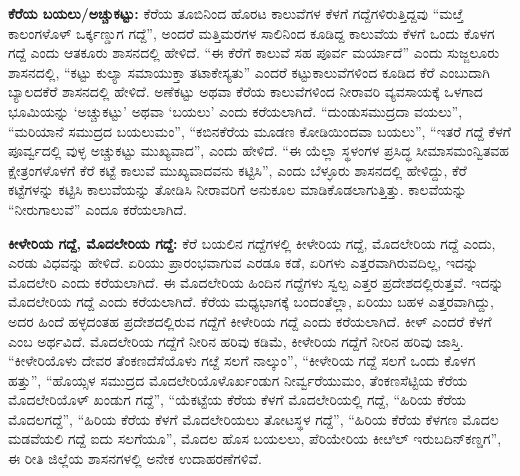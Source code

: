 \textbf{ಕೆರೆಯ ಬಯಲು/ಅಚ್ಚುಕಟ್ಟು:} ಕೆರೆಯ ತೂಬಿನಿಂದ ಹೊರಟ ಕಾಲುವೆಗಳ ಕೆಳಗೆ ಗದ್ದೆಗಳಿರುತ್ತಿದ್ದವು “ಮೞ್ತೆ ಕಾಲಂಗಳೊಳ್​ ಒರ್ಕ್ಕಣ್ಡುಗ ಗದ್ದೆ”, ಅಂದರೆ ಮತ್ತಿಮರಗಳ ಸಾಲಿನಿಂದ ಕೂಡಿದ್ದ ಕಾಲುವೆಯ ಕೆಳಗೆ ಒಂದು ಕೊಳಗ ಗದ್ದೆ ಎಂದು ಆತಕೂರು ಶಾಸನದಲ್ಲಿ ಹೇಳಿದೆ. “ಈ ಕೆರೆಗೆ ಕಾಲುವೆ ಸಹ ಪೂರ್ವ ಮರ್ಯಾದೆ” ಎಂದು ಸುಜ್ಜಲೂರು ಶಾಸನದಲ್ಲಿ, “ಕಟ್ಟು ಕುಲ್ಯಾ ಸಮಾಯುಕ್ತಾ ತಟಾಕೇಸ್ಯತು” ಎಂದರೆ ಕಟ್ಟುಕಾಲುವೆಗಳಿಂದ ಕೂಡಿದ ಕೆರೆ ಎಂಬುದಾಗಿ ಬ್ಯಾಲದಕೆರೆ ಶಾಸನದಲ್ಲಿ ಹೇಳಿದೆ. ಅಣೆಕಟ್ಟು ಅಥವಾ ಕೆರೆಯ ಕಾಲುವೆಗಳಿಂದ ನೀರಾವರಿ ವ್ಯವಸಾಯಕ್ಕೆ ಒಳಗಾದ ಭೂಮಿಯನ್ನು ‘ಅಚ್ಚುಕಟ್ಟು’ ಅಥವಾ ‘ಬಯಲು’ ಎಂದು ಕರೆಯಲಾಗಿದೆ. “ದುಂಡುಸಮುದ್ರದಾ ವಯಲು”, “ಮರಿಯಾನೆ ಸಮುದ್ರದ ಬಯಲುಮಂ”, “ಕಬಿನಕೆರೆಯ ಮೂಡಣ ಕೋಡಿಯಿಂದವಾ ಬಯಲು”, “ಇತರೆ ಗದ್ದೆ ಕೆಳಗೆ ಪೂರ್ವ್ವದಲ್ಲಿ ವುಳ್ಳ ಅಚ್ಚುಕಟ್ಟು ಮುಖ್ಯವಾದ”, ಎಂದು ಹೇಳಿದೆ. “ಈ ಯೆಲ್ಲಾ ಸ್ಥಳಂಗಳ ಪ್ರಸಿದ್ಧ ಸೀಮಾಸಮಂನ್ವಿತವಹ ಕ್ಷೇತ್ರಂಗಳೊಳಗೆ ಕೆರೆ ಕಟ್ಟೆ ಕಾಲುವೆ ಮುಖ್ಯವಾದವನು ಕಟ್ಟಿಸಿ”, ಎಂದು ಬೆಳ್ಳೂರು ಶಾಸನದಲ್ಲಿ ಹೇಳಿದ್ದು, ಕೆರೆ ಕಟ್ಟೆಗಳನ್ನು ಕಟ್ಟಿಸಿ ಕಾಲುವೆಯನ್ನು ತೋಡಿಸಿ ನೀರಾವರಿಗೆ ಅನುಕೂಲ ಮಾಡಿಕೊಡಲಾಗುತ್ತಿತ್ತು. ಕಾಲವೆಯನ್ನು “ನೀರುಗಾಲುವೆ” ಎಂದೂ ಕರೆಯಲಾಗಿದೆ.

\vskip 2pt

\textbf{ಕೀಳೇರಿಯ ಗದ್ದೆ, ಮೊದಲೇರಿಯ ಗದ್ದೆ:} ಕೆರೆ ಬಯಲಿನ ಗದ್ದೆಗಳಲ್ಲಿ ಕೀಳೇರಿಯ ಗದ್ದೆ, ಮೊದಲೇರಿಯ ಗದ್ದೆ ಎಂದು, ಎರಡು ವಿಧವನ್ನು ಹೇಳಿದೆ. ಏರಿಯು ಪ್ರಾರಂಭವಾಗುವ ಎರಡೂ ಕಡೆ, ಏರಿಗಳು ಎತ್ತರವಾಗಿರುವದಿಲ್ಲ, ಇದನ್ನು ಮೊದಲೇರಿ ಎಂದು ಕರೆಯಲಾಗಿದೆ. ಈ ಮೊದಲೇರಿಯ ಹಿಂದಿನ ಗದ್ದೆಗಳು ಸ್ವಲ್ಪ ಎತ್ತರ ಪ್ರದೇಶದಲ್ಲಿರುತ್ತವೆ. ಇದನ್ನು ಮೊದಲೇರಿಯ ಗದ್ದೆ ಎಂದು ಕರೆಯಲಾಗಿದೆ. ಕೆರೆಯ ಮಧ್ಯಭಾಗಕ್ಕೆ ಬಂದಂತೆಲ್ಲಾ, ಏರಿಯು ಬಹಳ ಎತ್ತರವಾಗಿದ್ದು, ಅದರ ಹಿಂದೆ ಹಳ್ಳದಂತಹ ಪ್ರದೇಶದಲ್ಲಿರುವ ಗದ್ದೆಗೆ ಕೀಳೇರಿಯ ಗದ್ದೆ ಎಂದು ಕರೆಯಲಾಗಿದೆ. ಕೀಳ್​ ಎಂದರೆ ಕೆಳಗೆ ಎಂಬ ಅರ್ಥವಿದೆ. ಮೊದಲೇರಿಯ ಗದ್ದೆಗೆ ನೀರಿನ ಹರಿವು ಕಡಿಮೆ, ಕೀಳೇರಿಯ ಗದ್ದೆಗೆ ನೀರಿನ ಹರಿವು ಜಾಸ್ತಿ. “ಕೀಳೇರಿಯೊಳು ದೇವರ ತೆಂಕಣದೆಸೆಯೊಳು ಗೞ್ದೆ ಸಲಗೆ ನಾಲ್ಕುಂ”, “ಕೀಳೇರಿಯ ಗದ್ದೆ ಸಲಗೆ ಒಂದು ಕೊಳಗ ಹತ್ತು”, “ಹೊಯ್ಸಳ ಸಮುದ್ರದ ಮೊದಲೇರಿಯೊಳೊರ್ಖಂಡುಗ ನೀರ್ವ್ವರೆಯುಮಂ, ತೆಂಕಣಸೆಟ್ಟಿಯ ಕೆರೆಯ ಮೊದಲೇರಿಯೊಳ್​ ಖಂಡುಗ ಗದ್ದೆ”, “ಯೆಕಟ್ಟೆಯ ಕೆರೆಯ ಕೆಳಗೆ ಮೊದಲೇರಿಯಲ್ಲಿ ಗದ್ದೆ, “ಹಿರಿಯ ಕೆರೆಯ ಮೊದಲಗದ್ದೆ”, “ಹಿರಿಯ ಕೆರೆಯ ಕೆಳಗೆ ಮೊದಲೇರಿಯಲು ತೋಟಸ್ಥಳ ಗದ್ದೆ”, “ಹಿರಿಯ ಕೆರೆಯ ಕೆಳಗಣ ಮೊದಲ ಮಡವೆಯಲಿ ಗದ್ದೆ ಐದು ಸಲಗೆಯೂ”, ಮೊದಲ ಹೊಸ ಬಯಲಲು, ಪೆರಿಯೇರಿಯ ಕೀೞಿಲ್​ ಇರುಬದಿನ್​ ಕಣ್ಡಗ”, ಈ ರೀತಿ ಜಿಲ್ಲೆಯ ಶಾಸನಗಳಲ್ಲಿ ಅನೇಕ ಉದಾಹರಣೆಗಳಿವೆ.

